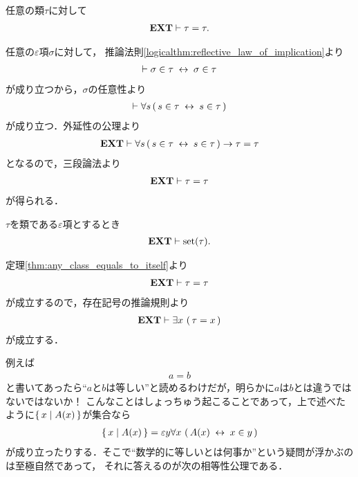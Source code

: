 	\begin{screen}
		\begin{thm}[任意の類は自分自身と等しい]
			\label{thm:any_class_equals_to_itself}
			任意の類$\tau$に対して
			\begin{align}
				\mbox{{\bf EXT}} \vdash \tau = \tau.
			\end{align}
		\end{thm}
	\end{screen}
	
	\begin{sketch}
		任意の$\varepsilon$項$\sigma$に対して，
		推論法則\ref{logicalthm:reflective_law_of_implication}より
		\begin{align}
			\vdash \sigma \in \tau \hspace{0.25em}\leftrightarrow\hspace{0.25em} \sigma \in \tau
		\end{align}
		が成り立つから，$\sigma$の任意性より
		\begin{align}
			\vdash \forall s\, (\, s \in \tau  \hspace{0.25em}\leftrightarrow\hspace{0.25em} s \in \tau\, )
		\end{align}
		が成り立つ．外延性の公理より
		\begin{align}
			\mbox{{\bf EXT}} \vdash \forall s\, (\, s \in \tau  \hspace{0.25em}\leftrightarrow\hspace{0.25em} s \in \tau\, )
			\rightarrow \tau = \tau
		\end{align}
		となるので，三段論法より
		\begin{align}
			\mbox{{\bf EXT}} \vdash \tau = \tau
		\end{align}
		が得られる．
		\QED
	\end{sketch}
	
	\begin{screen}
		\begin{thm}
			$\tau$を類である$\varepsilon$項とするとき
			\begin{align}
				\mbox{{\bf EXT}} \vdash \operatorname*{set} (\tau).
			\end{align}
		\end{thm}
	\end{screen}
	
	\begin{sketch}
		定理\ref{thm:any_class_equals_to_itself}より
		\begin{align}
			\mbox{{\bf EXT}} \vdash \tau = \tau
		\end{align}
		が成立するので，存在記号の推論規則より
		\begin{align}
			\mbox{{\bf EXT}} \vdash \exists x\, \left(\, \tau = x\, \right)
		\end{align}
		が成立する．
		\QED
	\end{sketch}
	
	例えば
	\begin{align}
		a = b
	\end{align}
	と書いてあったら``$a$と$b$は等しい''と読めるわけだが，明らかに$a$は$b$とは違うではないではないか！
	こんなことはしょっちゅう起こることであって，上で述べたように$\left\{\, x \mid A(x)\, \right\}$が集合なら
	\begin{align}
		\left\{\, x \mid A(x)\, \right\} = \varepsilon y \forall x\, \left(\, A(x) \hspace{0.25em}\leftrightarrow\hspace{0.25em} x \in y\, \right)
	\end{align}
	が成り立ったりする．そこで``数学的に等しいとは何事か''という疑問が浮かぶのは至極自然であって，
	それに答えるのが次の相等性公理である．
	
